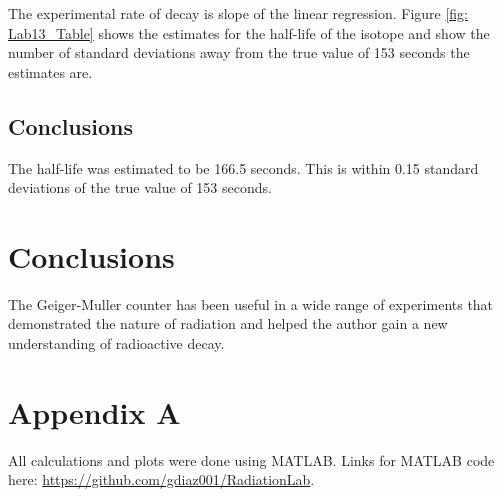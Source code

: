 \documentclass[reprint,amsmath,amssymb,aps,prl]{revtex4-2}
\begin{document}
The experimental rate of decay is  slope of the linear regression. Figure \ref{fig: Lab13_Table} shows the estimates for the half-life of the isotope and show the number of standard deviations away from the true value of 153 seconds the estimates are. 

\subsection{Conclusions}
The half-life was estimated to be 166.5 seconds. This is within 0.15 standard deviations of the true value of 153 seconds. 

\section{Conclusions}
The Geiger-Muller counter has been useful in a wide range of experiments that demonstrated the nature of radiation and helped the author gain a new understanding of radioactive decay. 



\section{Appendix A} 
All calculations and plots were done using MATLAB.  Links for MATLAB code here: \url{https://github.com/gdiaz001/RadiationLab}. 
\end{document}
